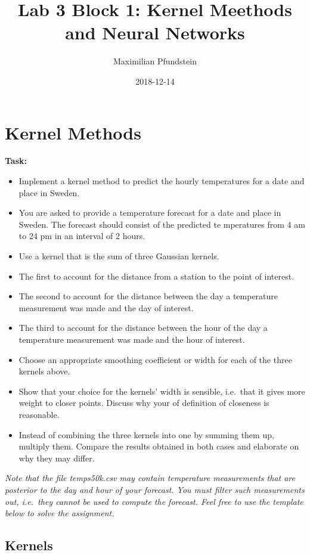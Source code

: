 \documentclass[]{article}
\title{Lab 3 Block 1: Kernel Meethods and Neural Networks}
\author{Maximilian Pfundstein}
\date{2018-12-14}
\providecommand{\tightlist}{%
  \setlength{\itemsep}{0pt}\setlength{\parskip}{0pt}}
\begin{document}
\maketitle

{
\setcounter{tocdepth}{3}
\tableofcontents
}
\section{Kernel Methods}\label{kernel-methods}

\textbf{Task:}

\begin{itemize}
\tightlist
\item
  Implement a kernel method to predict the hourly temperatures for a
  date and place in Sweden.
\item
  You are asked to provide a temperature forecast for a date and place
  in Sweden. The forecast should consist of the predicted te mperatures
  from 4 am to 24 pm in an interval of 2 hours.
\item
  Use a kernel that is the sum of three Gaussian kernels.
\item
  The first to account for the distance from a station to the point of
  interest.
\item
  The second to account for the distance between the day a temperature
  measurement was made and the day of interest.
\item
  The third to account for the distance between the hour of the day a
  temperature measurement was made and the hour of interest.
\item
  Choose an appropriate smoothing coefficient or width for each of the
  three kernels above.
\item
  Show that your choice for the kernels' width is sensible, i.e.~that it
  gives more weight to closer points. Discuss why your of definition of
  closeness is reasonable.
\item
  Instead of combining the three kernels into one by summing them up,
  multiply them. Compare the results obtained in both cases and
  elaborate on why they may differ.
\end{itemize}

\emph{Note that the file temps50k.csv may contain temperature
measurements that are posterior to the day and hour of your forecast.
You must filter such measurements out, i.e.~they cannot be used to
compute the forecast. Feel free to use the template below to solve the
assignment.}

\subsection{Kernels}\label{kernels}
\end{document}
